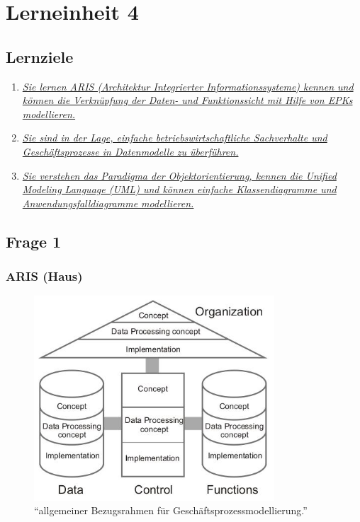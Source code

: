 \documentclass[a4paper]{article}
\begin{document}
			\pagebreak
			
			\section{Lerneinheit 4}
			\subsection{Lernziele}
			\begin{enumerate}
				\item \hyperref[le4-1]{\textit{Sie lernen ARIS (Architektur Integrierter Informationssysteme) kennen und können die Verknüpfung der Daten- und Funktionssicht mit Hilfe von EPKs modellieren.}}
				\item \hyperref[le4-2]{\textit{Sie sind in der Lage, einfache betriebswirtschaftliche Sachverhalte und Geschäftsprozesse in Datenmodelle zu überführen.}}
				\item \hyperref[le4-3]{\textit{Sie verstehen das Paradigma der Objektorientierung, kennen die Unified Modeling Language (UML) und können einfache Klassendiagramme und Anwendungsfalldiagramme modellieren.}}
			\end{enumerate}
			
			\subsection{Frage 1}
			\label{le4-1}
			\subsubsection{ARIS (Haus)}
			
			\begin{figure}[h]
				\centering
				\includegraphics[width=0.8\textwidth]{aris}
				\caption{``allgemeiner Bezugsrahmen für Geschäftsprozessmodellierung.''}
			\end{figure}
			
\end{document}
